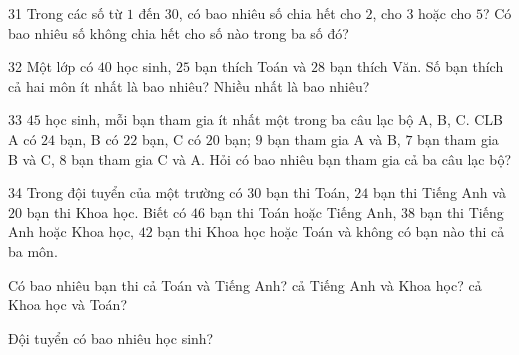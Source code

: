\begin{probbox}{31}{}
Trong các số từ $1$ đến $30$, có bao nhiêu số chia hết cho $2$, cho $3$ hoặc cho $5$? Có bao nhiêu số không chia hết cho số nào trong ba số đó?
\end{probbox}
\gap
\begin{probbox}{32}{}
Một lớp có $40$ học sinh, $25$ bạn thích Toán và $28$ bạn thích Văn. Số bạn thích cả hai môn ít nhất là bao nhiêu? Nhiều nhất là bao nhiêu?
\end{probbox}
\gap
\begin{probbox}{33}{}
$45$ học sinh, mỗi bạn tham gia ít nhất một trong ba câu lạc bộ A, B, C. CLB A có $24$ bạn, B có $22$ bạn, C có $20$ bạn; $9$ bạn tham gia A và B, $7$ bạn tham gia B và C, $8$ bạn tham gia C và A. Hỏi có bao nhiêu bạn tham gia cả ba câu lạc bộ?
\end{probbox}
\gap
\begin{probbox}{34}{}
Trong đội tuyển của một trường có $30$ bạn thi Toán, $24$ bạn thi Tiếng Anh và $20$ bạn thi Khoa học. Biết có $46$ bạn thi Toán hoặc Tiếng Anh, $38$ bạn thi Tiếng Anh hoặc Khoa học, $42$ bạn thi Khoa học hoặc Toán và không có bạn nào thi cả ba môn.\par
{} Có bao nhiêu bạn thi cả Toán và Tiếng Anh? \quad {} cả Tiếng Anh và Khoa học? \quad {} cả Khoa học và Toán?\par
{} Đội tuyển có bao nhiêu học sinh?
\end{probbox}
